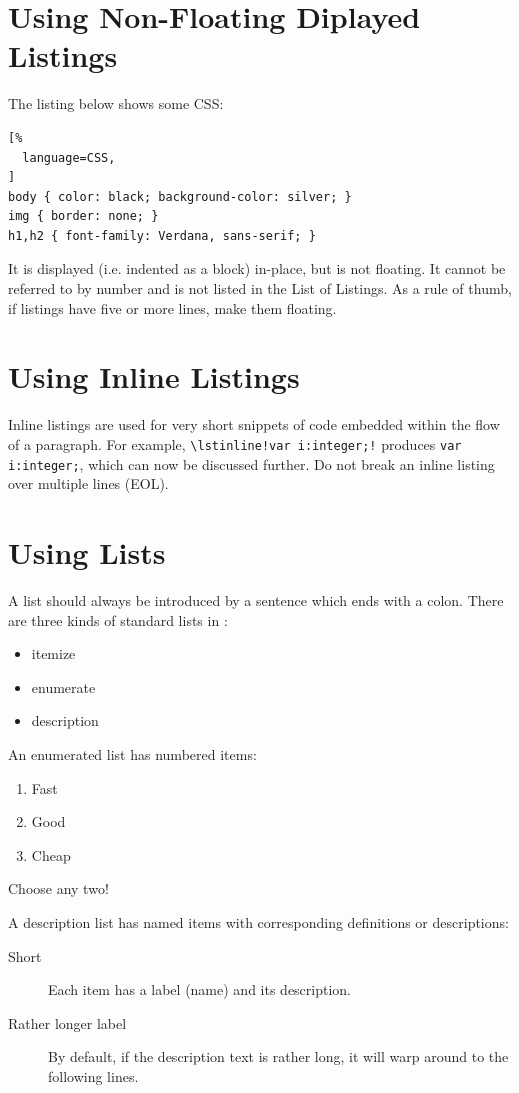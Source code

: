 \section{Using Non-Floating Diplayed Listings}

The listing below shows some CSS:
\begin{samepage}
\begin{lstlisting}[%
  language=CSS,
]
body { color: black; background-color: silver; }
img { border: none; }
h1,h2 { font-family: Verdana, sans-serif; }
\end{lstlisting}
\end{samepage}
It is displayed (i.e. indented as a block) in-place, but is not
floating. It cannot be referred to by number and is not listed in the
List of Listings. As a rule of thumb, if listings have five or more
lines, make them floating.





\section{Using Inline Listings}

Inline listings are used for very short snippets of code embedded
within the flow of a paragraph. For example,
\lstinline|\lstinline!var i:integer;!|
produces
\lstinline!var i:integer;!, which can now be discussed further.
Do not break an inline listing over multiple lines (EOL).




\section{Using Lists}

A list should always be introduced by a sentence
which ends with a colon.
%
There are three kinds of standard lists in \LaTeXe:
\begin{itemize}
\item itemize
\item enumerate
\item description
\end{itemize}
An enumerated list has numbered items:
\begin{enumerate}
\item Fast
\item Good
\item Cheap
\end{enumerate}
Choose any two!


A description list has named items with corresponding
definitions or descriptions:
\begin{description}
\item[Short] Each item has a label (name) and its description.

\item[Rather longer label] By default, if the description text
  is rather long, it will warp around to the following lines.
\end{description}



